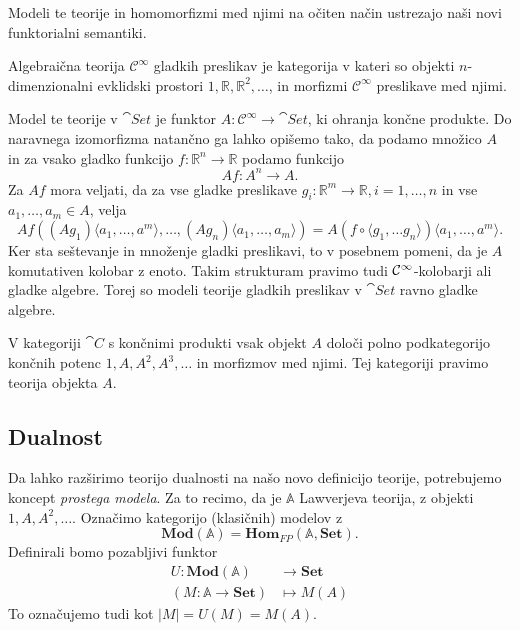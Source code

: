 \documentclass[../kategoricna_logika.tex]{subfiles}
\begin{document}
Modeli te teorije in homomorfizmi med njimi na očiten način ustrezajo naši novi
funktorialni semantiki.
\begin{primer}
Algebraična teorija \(\mathcal{C}^{\infty}\) gladkih preslikav je kategorija
v kateri so objekti $n$-dimenzionalni evklidski prostori \(1, \mathbb{R}, \mathbb{R}^2, \ldots\),
in morfizmi \(\mathcal{C}^{\infty}\) preslikave med njimi.

Model te teorije v \(\cat{Set}\) je funktor \(A : \mathcal{C}^{\infty} \to \cat{Set}\),
ki ohranja končne produkte. Do naravnega izomorfizma natančno ga lahko opišemo tako, da
podamo množico \(A\) in za vsako gladko funkcijo \(f : \mathbb{R}^n \to \mathbb{R}\)
podamo funkcijo
\[Af : A^n \to A.\]
Za \(Af\) mora veljati, da za vse gladke preslikave
\(g_i : \mathbb{R}^m \to \mathbb{R}, i = 1, \ldots, n\) in vse \(a_1, \ldots, a_m \in A\),
velja
\[ 
   Af \left( (Ag_1)\langle a_1, \ldots, a^m \rangle, \ldots, (Ag_n)\langle a_1, \ldots, a_m \rangle \right) =
   A(f \circ \langle g_1, \ldots g_n \rangle)\langle a_1, \ldots, a^m \rangle.
\]
Ker sta seštevanje in množenje gladki preslikavi, to v posebnem pomeni,
da je \(A\) komutativen kolobar z enoto.
Takim strukturam pravimo tudi $\mathcal{C}\textsuperscript{\(\infty\)}$-kolobarji
ali gladke algebre. Torej so modeli teorije gladkih preslikav v $\cat{Set}$ ravno gladke algebre.
\end{primer}
%
\begin{primer}
V kategoriji \(\cat{C}\) s končnimi produkti vsak objekt \(A\) določi polno podkategorijo
končnih potenc \(1, A, A^2, A^3, \ldots\) in morfizmov med njimi. Tej kategoriji
pravimo teorija objekta \(A\).
\end{primer}
\subsection{Dualnost}
\label{sec:orgef98ac4}
Da lahko razširimo teorijo dualnosti na našo novo definicijo teorije, potrebujemo
koncept \emph{prostega modela}. Za to recimo, da je \(\mathbb{A}\) Lawverjeva teorija,
z objekti \(1, A, A^2, \ldots\). Označimo kategorijo (klasičnih) modelov z
\[ \mathbf{Mod}(\mathbb{A}) = \mathbf{Hom}_{FP}(\mathbb{A}, \mathbf{Set}). \]
Definirali bomo pozabljivi funktor
\begin{align*}
U : \mathbf{Mod}(\mathbb{A}) &\to \mathbf{Set} \\
(M : \mathbb{A} \to \mathbf{Set}) &\mapsto M(A)
\end{align*}
To označujemo tudi kot \(|M| = U(M) = M(A)\).
\end{document}
